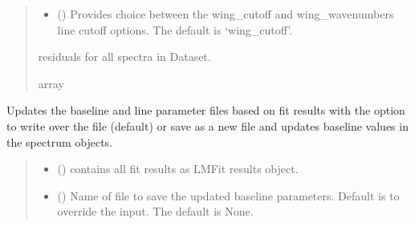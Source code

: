\documentclass[letterpaper,10pt,english]{sphinxmanual}
\begin{document}
\begin{fulllineitems}
\begin{fulllineitems}
\begin{quote}
\begin{description}
\begin{itemize}
\item {} 
\sphinxAtStartPar
{} (\sphinxstyleliteralemphasis{\sphinxupquote{, }}) \textendash{} Provides choice between the wing\_cutoff and wing\_wavenumbers line cut\sphinxhyphen{}off options. The default is ‘wing\_cutoff’.

\end{itemize}

\sphinxAtStartPar
{} \textendash{} residuals for all spectra in Dataset.

\sphinxAtStartPar
array

\end{description}\end{quote}

\end{fulllineitems}


\begin{fulllineitems}
\label{\detokenize{MATS:MATS.fit_dataset.Fit_DataSet.update_params}}
\pysigstartsignatures
{}
\pysigstopsignatures
\sphinxAtStartPar
Updates the baseline and line parameter files based on fit results with the option to write over the file (default) or save as a new file and updates baseline values in the spectrum objects.
\begin{quote}\begin{description}
\begin{itemize}
\item {} 
\sphinxAtStartPar
{} () \textendash{} contains all fit results as LMFit results object.

\item {} 
\sphinxAtStartPar
{} (\sphinxstyleliteralemphasis{\sphinxupquote{, }}) \textendash{} Name of file to save the updated baseline parameters. Default is to override the input. The default is None.


\end{itemize}
\end{description}
\end{quote}
\end{fulllineitems}
\end{fulllineitems}
\end{document}
